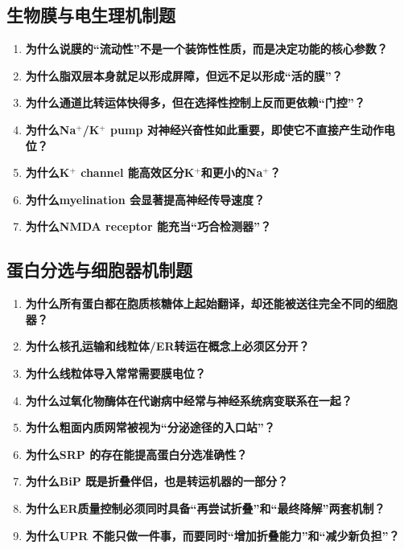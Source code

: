 \documentclass[12pt,fontset=none]{ctexart}
\begin{document}
\subsection*{生物膜与电生理机制题}
\begin{enumerate}
\item \textbf{为什么说膜的“流动性”不是一个装饰性性质，而是决定功能的核心参数？}

\item \textbf{为什么脂双层本身就足以形成屏障，但远不足以形成“活的膜”？}

\item \textbf{为什么通道比转运体快得多，但在选择性控制上反而更依赖“门控”？}

\item \textbf{为什么Na$^+$/K$^+$ pump 对神经兴奋性如此重要，即使它不直接产生动作电位？}

\item \textbf{为什么K$^+$ channel 能高效区分K$^+$和更小的Na$^+$？}

\item \textbf{为什么myelination 会显著提高神经传导速度？}

\item \textbf{为什么NMDA receptor 能充当“巧合检测器”？}

\end{enumerate}



\subsection*{蛋白分选与细胞器机制题}
\begin{enumerate}
\item \textbf{为什么所有蛋白都在胞质核糖体上起始翻译，却还能被送往完全不同的细胞器？}

\item \textbf{为什么核孔运输和线粒体/ER转运在概念上必须区分开？}

\item \textbf{为什么线粒体导入常常需要膜电位？}

\item \textbf{为什么过氧化物酶体在代谢病中经常与神经系统病变联系在一起？}

\item \textbf{为什么粗面内质网常被视为“分泌途径的入口站”？}

\item \textbf{为什么SRP 的存在能提高蛋白分选准确性？}

\item \textbf{为什么BiP 既是折叠伴侣，也是转运机器的一部分？}

\item \textbf{为什么ER质量控制必须同时具备“再尝试折叠”和“最终降解”两套机制？}

\item \textbf{为什么UPR 不能只做一件事，而要同时“增加折叠能力”和“减少新负担”？}

\end{enumerate}
\end{document}
